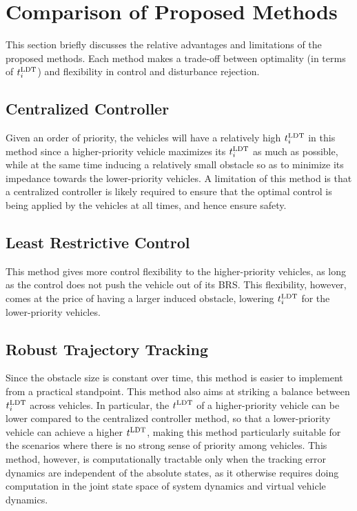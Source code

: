 \section{Comparison of Proposed Methods}
This section briefly discusses the relative advantages and limitations of the proposed methods. Each method makes a trade-off between optimality (in terms of $t^\text{LDT}_i$) and flexibility in control and disturbance rejection.

\subsection{Centralized Controller}
Given an order of priority, the vehicles will have a relatively high $t^\text{LDT}_i$ in this method since a higher-priority vehicle maximizes its $t^\text{LDT}_i$ as much as possible, while at the same time inducing a relatively small obstacle so as to minimize its impedance towards the lower-priority vehicles. A limitation of this method is that a centralized controller is likely required to ensure that the optimal control is being applied by the vehicles at all times, and hence ensure safety.

\subsection{Least Restrictive Control}
This method gives more control flexibility to the higher-priority vehicles, as long as the control does not push the vehicle out of its BRS. This flexibility, however, comes at the price of having a larger induced obstacle, lowering $t^\text{LDT}_i$ for the lower-priority vehicles.  

\subsection{Robust Trajectory Tracking}
Since the obstacle size is constant over time, this method is easier to implement from a practical standpoint. This method also aims at striking a balance between $t^\text{LDT}_i$ across vehicles. In particular, the $t^\text{LDT}$ of a higher-priority vehicle can be lower compared to the centralized controller method, so that a lower-priority vehicle can achieve a higher $t^\text{LDT}$, making this method particularly suitable for the scenarios where there is no strong sense of priority among vehicles. This method, however, is computationally tractable only when the tracking error dynamics are independent of the absolute states, as it otherwise requires doing computation in the joint state space of system dynamics and virtual vehicle dynamics. 